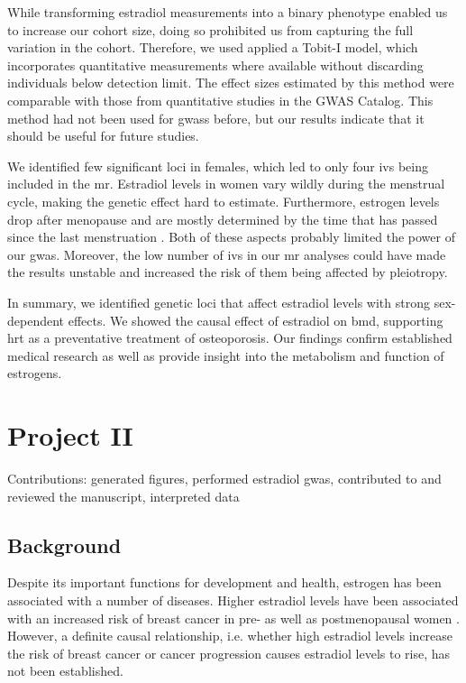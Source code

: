 \documentclass[draft, twoside=false]{scrbook}
\begin{document}
While transforming estradiol measurements into a binary phenotype enabled us to increase our cohort size, doing so prohibited us from capturing the full variation in the cohort.
Therefore, we used applied a Tobit-I model, which incorporates quantitative measurements where available without discarding individuals below detection limit.
The effect sizes estimated by this method were comparable with those from quantitative studies in the GWAS Catalog.
This method had not been used for \glspl{gwas} before, but our results indicate that it should be useful for future studies.

We identified few significant loci in females, which led to only four \glspl{iv} being included in the \gls{mr}.
Estradiol levels in women vary wildly during the menstrual cycle, making the genetic effect hard to estimate.
Furthermore, estrogen levels drop after menopause and are mostly determined by the time that has passed since the last menstruation \cite{Richardson2020}.
Both of these aspects probably limited the power of our \gls{gwas}.
Moreover, the low number of \glspl{iv} in our \gls{mr} analyses could have made the results unstable and increased the risk of them being affected by pleiotropy.

In summary, we identified genetic loci that affect estradiol levels with strong sex-dependent effects.
We showed the causal effect of estradiol on \gls{bmd}, supporting \gls{hrt} as a preventative treatment of osteoporosis.
Our findings confirm established medical research as well as provide insight into the metabolism and function of estrogens.

\chapter{Project II}
{
    \parindent 0pt \color{gray}
    Contributions: generated figures, performed estradiol \gls{gwas}, contributed to and reviewed the manuscript, interpreted data
}

\section{Background}
Despite its important functions for development and health, estrogen has been associated with a number of diseases.
Higher estradiol levels have been associated with an increased risk of breast cancer in pre- as well as postmenopausal women \cite{Key2013,Kaaks2005,Zhang2013,Kaaks2005a}.
However, a definite causal relationship, i.e. whether high estradiol levels increase the risk of breast cancer or cancer progression causes estradiol levels to rise, has not been established.
\end{document}
